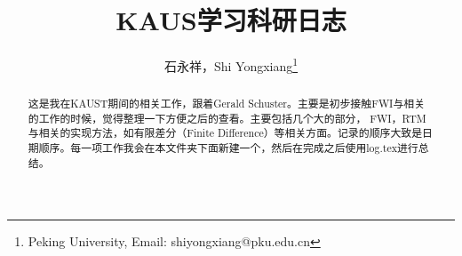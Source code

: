 \documentclass[UTF8, 10pt, a4paper]{article}
\title{KAUS学习科研日志}
\author{石永祥，Shi Yongxiang\footnote{Peking University, Email: shiyongxiang@pku.edu.cn}}
\begin{document}
    \maketitle
    \begin{abstract}
        这是我在KAUST期间的相关工作，跟着Gerald Schuster。主要是初步接触FWI与相关的工作的时候，觉得整理一下方便之后的查看。主要包括几个大的部分， FWI，RTM与相关的实现方法，如有限差分（Finite Difference）等相关方面。记录的顺序大致是日期顺序。每一项工作我会在本文件夹下面新建一个，然后在完成之后使用log.tex进行总结。
    \end{abstract} 
    
    
    
\end{document}
